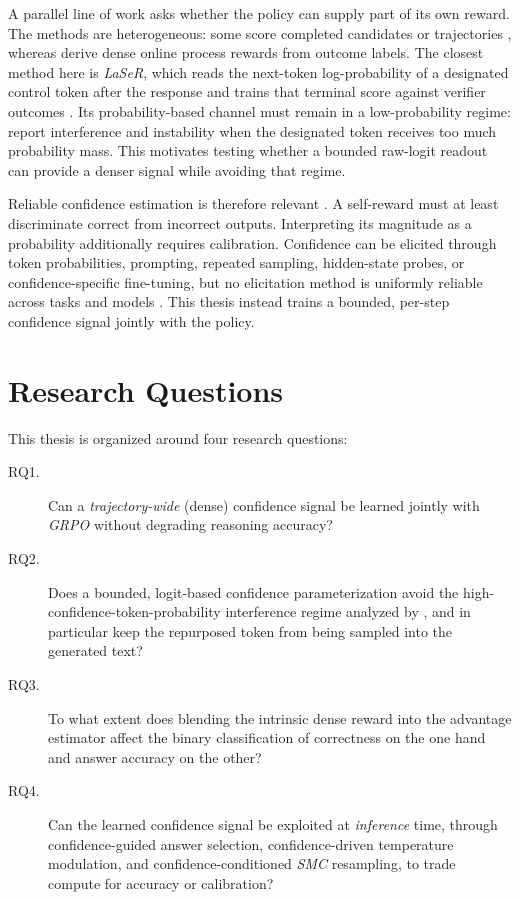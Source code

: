 \documentclass[a4paper,oneside,10pt,english]{scrbook}
\DeclareRobustCommand{\acfit}[1]{\textit{\ac{#1}}}
\begin{document}
A parallel line of work asks whether the policy can supply part of its own reward. The methods are heterogeneous: some score completed candidates or trajectories \citep{selfrewardingllms,confasreward,reasonwithoutexternalrewards,corewarding,beyondbinaryrewards,ttrl}, whereas \citet{reinforcementimplicitrewards} derive dense online process rewards from outcome labels. The closest method here is \acfit{LaSeR}, which reads the next-token log-probability of a designated control token after the response and trains that terminal score against verifier outcomes \citep{laser}. Its probability-based channel must remain in a low-probability regime: \citet{laser} report interference and instability when the designated token receives too much probability mass. This motivates testing whether a bounded raw-logit readout can provide a denser signal while avoiding that regime.

Reliable confidence estimation is therefore relevant \citep{nncalibration,confestcalibsurvey,bayesianbinning,probabilisticoutputs,strictlyproper,forecastverification}. A self-reward must at least discriminate correct from incorrect outputs. Interpreting its magnitude as a probability additionally requires calibration. Confidence can be elicited through token probabilities, prompting, repeated sampling, hidden-state probes, or confidence-specific fine-tuning, but no elicitation method is uniformly reliable across tasks and models \citep{confelicitation,verbalizedconfidence,justaskforcalibration,llmsknowwhattheyknow,semanticuncertainty,selfcheckgpt,internalstatelying}. This thesis instead trains a bounded, per-step confidence signal jointly with the policy.

\section{Research Questions}
\label{sec:intro:rqs}

This thesis is organized around four research questions:
\begin{description}
	\item[RQ1.] Can a \emph{trajectory-wide} (dense) confidence signal be learned jointly with \acfit{GRPO} \citep{deepseekmath} without degrading reasoning accuracy?
	\item[RQ2.] Does a bounded, logit-based confidence parameterization avoid the high-confidence-token-probability interference regime analyzed by \citet{laser}, and in particular keep the repurposed token from being sampled into the generated text?
	\item[RQ3.] To what extent does blending the intrinsic dense reward into the advantage estimator affect the binary classification of correctness on the one hand and answer accuracy on the other?
	\item[RQ4.] Can the learned confidence signal be exploited at \emph{inference} time, through confidence-guided answer selection, confidence-driven temperature modulation, and confidence-conditioned \acfit{SMC} resampling, to trade compute for accuracy or calibration?
\end{description}
\end{document}

